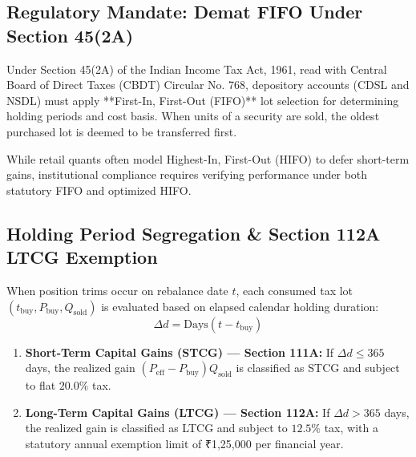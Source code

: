 \documentclass[11pt,a4paper]{article}
\begin{document}
\subsection{Regulatory Mandate: Demat FIFO Under Section 45(2A)}
Under Section 45(2A) of the Indian Income Tax Act, 1961, read with Central Board of Direct Taxes (CBDT) Circular No. 768, depository accounts (CDSL and NSDL) must apply **First-In, First-Out (FIFO)** lot selection for determining holding periods and cost basis. When units of a security are sold, the oldest purchased lot is deemed to be transferred first.

While retail quants often model Highest-In, First-Out (HIFO) to defer short-term gains, institutional compliance requires verifying performance under both statutory FIFO and optimized HIFO.

\subsection{Holding Period Segregation \& Section 112A LTCG Exemption}
When position trims occur on rebalance date $t$, each consumed tax lot $(t_{\text{buy}}, P_{\text{buy}}, Q_{\text{sold}})$ is evaluated based on elapsed calendar holding duration:
\begin{equation}
\Delta d = \text{Days}(t - t_{\text{buy}})
\end{equation}
\begin{enumerate}[leftmargin=*]
    \item \textbf{Short-Term Capital Gains (STCG) --- Section 111A:} If $\Delta d \le 365$ days, the realized gain $(P_{\text{eff}} - P_{\text{buy}}) Q_{\text{sold}}$ is classified as STCG and subject to flat $20.0\%$ tax.
    \item \textbf{Long-Term Capital Gains (LTCG) --- Section 112A:} If $\Delta d > 365$ days, the realized gain is classified as LTCG and subject to $12.5\%$ tax, with a statutory annual exemption limit of ₹1,25,000 per financial year.
\end{enumerate}
\end{document}
